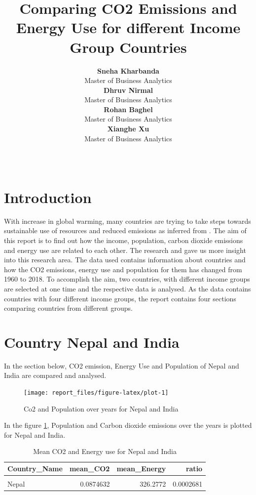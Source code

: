 \documentclass[11pt,a4paper,]{article}
\title{Comparing CO2 Emissions and Energy Use for different Income Group Countries}
\author{\sf\Large\textbf{ Sneha Kharbanda}\\ {\sf\large Master of Business Analytics\\[0.5cm]} \sf\Large\textbf{ Dhruv Nirmal}\\ {\sf\large Master of Business Analytics\\[0.5cm]} \sf\Large\textbf{ Rohan Baghel}\\ {\sf\large Master of Business Analytics\\[0.5cm]} \sf\Large\textbf{ Xianghe Xu}\\ {\sf\large Master of Business Analytics\\[0.5cm]}}
\date{\sf\Date~\Month~\Year}
\makeatletter
\def\titlepage{\front{\expandafter{\@title}}{\@author}{\@organization}}
\makeatother
\begin{document}
\titlepage

\section*{Introduction}

With increase in global warming, many countries are trying to take steps towards sustainable use of resources and reduced emissions as inferred from \textcite{g2012w}. The aim of this report is to find out how the income, population, carbon dioxide emissions and energy use are related to each other. The research \textcite{DISLI2016418} and \textcite{o2010global} gave us more insight into this research area. The data used contains information about countries and how the CO2 emissions, energy use and population for them has changed from 1960 to 2018. To accomplish the aim, two countries, with different income groups are selected at one time and the respective data is analysed. As the data contains countries with four different income groups, the report contains four sections comparing countries from different groups.

\section*{Country Nepal and India}

In the section below, CO2 emission, Energy Use and Population of Nepal and India are compared and analysed.

\begin{figure}

{\centering \texttt{[image: report\_files/figure-latex/plot-1]} 

}

\caption{Co2 and Population over years for Nepal and India}\label{fig:plot}
\end{figure}

In the figure \ref{fig:plot}, Population and Carbon dioxide emissions over the years is plotted for Nepal and India.

\begin{table}[!h]

\caption{\label{tab:mean-CO2-and-Population}Mean CO2 and Energy use for Nepal and India}
\centering
\begin{tabular}[t]{lrrr}
\toprule
Country\_Name & mean\_CO2 & mean\_Energy & ratio\\
\midrule
\cellcolor{gray!6}{India} & \cellcolor{gray!6}{0.8221630} & \cellcolor{gray!6}{384.9569} & \cellcolor{gray!6}{0.0021357}\\
Nepal & 0.0874632 & 326.2772 & 0.0002681\\
\bottomrule
\end{tabular}
\end{table}
\end{document}
